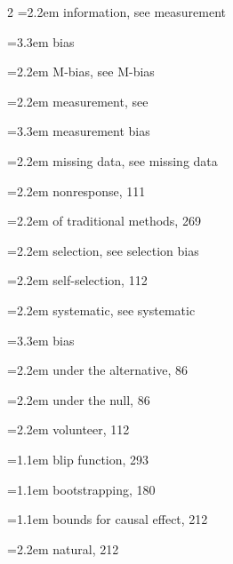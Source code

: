 \begin{multicols}{2}
\hspace*{1.1em}\hangindent=2.2em information, see measurement\par
\hspace*{2.2em}\hangindent=3.3em bias\par
\hspace*{1.1em}\hangindent=2.2em M-bias, see M-bias\par
\hspace*{1.1em}\hangindent=2.2em measurement, see\par
\hspace*{2.2em}\hangindent=3.3em measurement bias\par
\hspace*{1.1em}\hangindent=2.2em missing data, see missing data\par
\hspace*{1.1em}\hangindent=2.2em nonresponse, 111\par
\hspace*{1.1em}\hangindent=2.2em of traditional methods, 269\par
\hspace*{1.1em}\hangindent=2.2em selection, see selection bias\par
\hspace*{1.1em}\hangindent=2.2em self-selection, 112\par
\hspace*{1.1em}\hangindent=2.2em systematic, see systematic\par
\hspace*{2.2em}\hangindent=3.3em bias\par
\hspace*{1.1em}\hangindent=2.2em under the alternative, 86\par
\hspace*{1.1em}\hangindent=2.2em under the null, 86\par
\hspace*{1.1em}\hangindent=2.2em volunteer, 112\par
\hangindent=1.1em blip function, 293\par
\hangindent=1.1em bootstrapping, 180\par
\hangindent=1.1em bounds for causal effect, 212\par
\hspace*{1.1em}\hangindent=2.2em natural, 212\par

\end{multicols}
